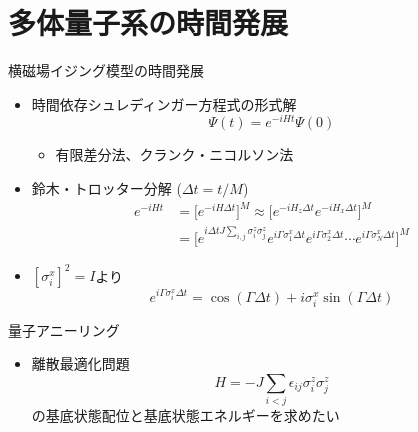 \section{多体量子系の時間発展}

\begin{frame}[t,fragile]{横磁場イジング模型の時間発展}
  \begin{itemize}
  \item 時間依存シュレディンガー方程式の形式解
    \[
    \Psi(t) = e^{-iHt} \Psi(0)
    \]
    \begin{itemize}
    \item 有限差分法、クランク・ニコルソン法
    \end{itemize}
  \item 鈴木・トロッター分解 ($\Delta t = t / M$)
    \begin{align*}
      e^{-iHt} &= \big[ e^{-iH\Delta t} \big]^M \approx \big[ e^{-iH_z\Delta t} e^{-iH_x\Delta t} \big]^M \\
      &= \big[ e^{i\Delta t J \sum_{i,j} \sigma_i^z \sigma_j^z} e^{i\Gamma \sigma_1^x\Delta t} e^{i\Gamma \sigma_2^x\Delta t} \cdots e^{i\Gamma \sigma_N^x\Delta t} \big]^M
    \end{align*}
  \item $[\sigma_i^x]^2 = I$より
    \[
    e^{i\Gamma \sigma_i^x\Delta t} = \cos (\Gamma\Delta t) + i \sigma_i^x \sin (\Gamma\Delta t)
    \]
  \end{itemize}
\end{frame}

\begin{frame}[t,fragile]{量子アニーリング}
  \begin{itemize}
  \item 離散最適化問題
    \[
    H = -J \sum_{i<j} \epsilon_{ij} \sigma_i^z \sigma_j^z
    \]
    の基底状態配位と基底状態エネルギーを求めたい
  \end{itemize}
\end{frame}

